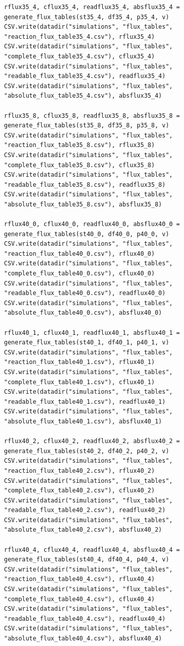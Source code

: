 \documentclass[11pt]{article}
\begin{document}
\begin{verbatim}
rflux35_4, cflux35_4, readflux35_4, absflux35_4 = generate_flux_tables(st35_4, df35_4, p35_4, v)
CSV.write(datadir("simulations", "flux_tables", "reaction_flux_table35_4.csv"), rflux35_4)
CSV.write(datadir("simulations", "flux_tables", "complete_flux_table35_4.csv"), cflux35_4)
CSV.write(datadir("simulations", "flux_tables", "readable_flux_table35_4.csv"), readflux35_4)
CSV.write(datadir("simulations", "flux_tables", "absolute_flux_table35_4.csv"), absflux35_4)

rflux35_8, cflux35_8, readflux35_8, absflux35_8 = generate_flux_tables(st35_8, df35_8, p35_8, v)
CSV.write(datadir("simulations", "flux_tables", "reaction_flux_table35_8.csv"), rflux35_8)
CSV.write(datadir("simulations", "flux_tables", "complete_flux_table35_8.csv"), cflux35_8)
CSV.write(datadir("simulations", "flux_tables", "readable_flux_table35_8.csv"), readflux35_8)
CSV.write(datadir("simulations", "flux_tables", "absolute_flux_table35_8.csv"), absflux35_8)

rflux40_0, cflux40_0, readflux40_0, absflux40_0 = generate_flux_tables(st40_0, df40_0, p40_0, v)
CSV.write(datadir("simulations", "flux_tables", "reaction_flux_table40_0.csv"), rflux40_0)
CSV.write(datadir("simulations", "flux_tables", "complete_flux_table40_0.csv"), cflux40_0)
CSV.write(datadir("simulations", "flux_tables", "readable_flux_table40_0.csv"), readflux40_0)
CSV.write(datadir("simulations", "flux_tables", "absolute_flux_table40_0.csv"), absflux40_0)

rflux40_1, cflux40_1, readflux40_1, absflux40_1 = generate_flux_tables(st40_1, df40_1, p40_1, v)
CSV.write(datadir("simulations", "flux_tables", "reaction_flux_table40_1.csv"), rflux40_1)
CSV.write(datadir("simulations", "flux_tables", "complete_flux_table40_1.csv"), cflux40_1)
CSV.write(datadir("simulations", "flux_tables", "readable_flux_table40_1.csv"), readflux40_1)
CSV.write(datadir("simulations", "flux_tables", "absolute_flux_table40_1.csv"), absflux40_1)

rflux40_2, cflux40_2, readflux40_2, absflux40_2 = generate_flux_tables(st40_2, df40_2, p40_2, v)
CSV.write(datadir("simulations", "flux_tables", "reaction_flux_table40_2.csv"), rflux40_2)
CSV.write(datadir("simulations", "flux_tables", "complete_flux_table40_2.csv"), cflux40_2)
CSV.write(datadir("simulations", "flux_tables", "readable_flux_table40_2.csv"), readflux40_2)
CSV.write(datadir("simulations", "flux_tables", "absolute_flux_table40_2.csv"), absflux40_2)

rflux40_4, cflux40_4, readflux40_4, absflux40_4 = generate_flux_tables(st40_4, df40_4, p40_4, v)
CSV.write(datadir("simulations", "flux_tables", "reaction_flux_table40_4.csv"), rflux40_4)
CSV.write(datadir("simulations", "flux_tables", "complete_flux_table40_4.csv"), cflux40_4)
CSV.write(datadir("simulations", "flux_tables", "readable_flux_table40_4.csv"), readflux40_4)
CSV.write(datadir("simulations", "flux_tables", "absolute_flux_table40_4.csv"), absflux40_4)


\end{verbatim}
\end{document}
